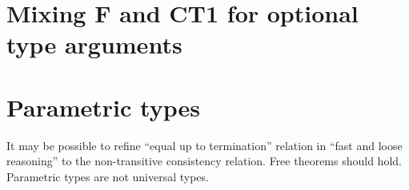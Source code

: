 \documentclass{amsart}
\begin{document}
\section{Mixing F and CT1 for optional type arguments}



\section{Parametric types}

It may be possible to refine ``equal up to termination'' relation
in ``fast and loose reasoning'' to the non-transitive consistency
relation. Free theorems should hold. Parametric types are not
universal types.



\end{document}
